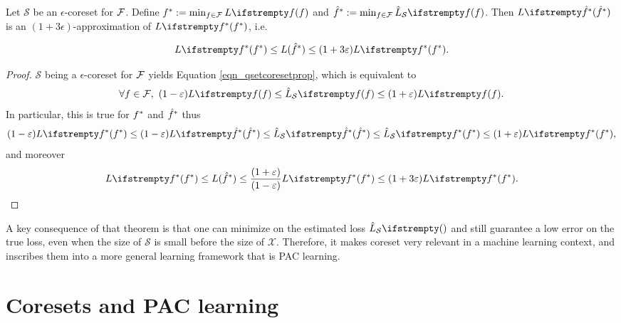\begin{tcolorbox}
    \begin{theorem}
        \label{thm_optcoreset}
        Let $\mathcal{S}$ be an $\epsilon$-coreset for $\mathcal{F}$. Define $\query^*:=\min_{\query \in \qset}\loss{\query}$ and $\hat \query^*:=\min_{\query \in \qset}\estloss{\mathcal{S}}{\query}$. Then $\loss{\hat\query^*} $ is an $(1+3\epsilon)$-approximation of $\loss{\query^*}$, i.e.
    
        \begin{equation*}
            \loss{\query^*} \le {L}( \hat\query^*)\leq (1+ 3 \epsilon)\loss{\query^*}.
        \end{equation*}
    \end{theorem}
\end{tcolorbox}
\begin{proof}
    $\mathcal{S}$ being a $\epsilon$-coreset for $\mathcal{F}$ yields Equation \ref{eqn_qsetcoresetprop}, which is equivalent to 
    \begin{equation*}
        \forall \query \in \qset ,\ (1-\epsilon) \loss{\query} \le \estloss{\mathcal{S}}{\query} \le(1+\epsilon) \loss{\query}.
    \end{equation*}
    In particular, this is true for $f^*$ and $\hat {f}^*$ thus
    \begin{equation}
        (1-\epsilon) \loss{\query^*} \le(1-\epsilon) \loss{\hat\query^*} \le \estloss{\mathcal{S}}{\hat\query^*} \le \estloss{\mathcal{S}}{\query^*} \le(1+\epsilon) \loss{\query^*},
    \end{equation}
    and moreover
    \begin{equation*}
        \loss{\query^*} \le {L}( \hat\query^*) \le \frac{(1+\epsilon)}{(1-\epsilon) } \loss{\query^*} \leq (1+ 3 \epsilon)\loss{\query^*}.
        \end{equation*}
\end{proof}
A key consequence of that theorem is that one can minimize on the estimated loss $\estloss{\mathcal{S}}{}$ and still guarantee a low error on the true loss, even when the size of $\mathcal{S}$ is small before the size of $\mathcal{X}$. Therefore, it makes coreset very relevant in a machine learning context, and  inscribes them into a more general learning framework that is PAC learning.

\section{Coresets and PAC learning}
